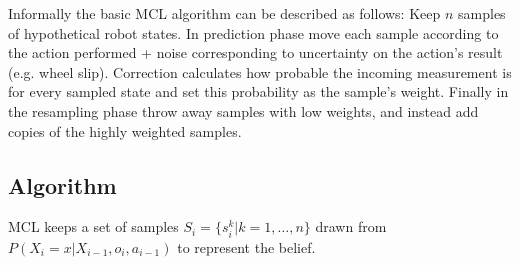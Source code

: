 Informally the basic MCL algorithm can be described as follows:
Keep \(n\) samples of hypothetical robot states.
In prediction phase move each sample according to the action performed + noise corresponding
to uncertainty on the action's result (e.g. wheel slip).
Correction calculates how probable the incoming measurement is
for every sampled state and set this probability as the sample's weight.
Finally in the resampling phase throw away samples with low weights, and
instead add copies of the highly weighted samples.

\subsection{Algorithm}

MCL keeps a set of samples \(S_i = \{s^k_{i} | k = 1,\dotsc,n\} \) drawn from
\(P(X_i = x | X_{i-1}, o_i, a_{i - 1})\) to represent the belief.

